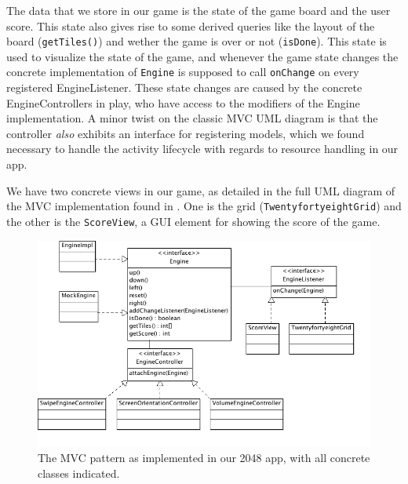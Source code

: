 \documentclass[a4paper, 12pt]{article}
\newcommand{\code}[1]{\texttt{#1}}
\begin{document}
The data that we store in our game is the state of the game board and
the user score. This state also gives rise to some derived queries
like the layout of the board (\code{getTiles()}) and wether the game
is over or not (\code{isDone}). This state is used to visualize the
state of the game, and whenever the game state changes the concrete
implementation of \code{Engine} is supposed to call \code{onChange} on
every registered EngineListener. These state changes are caused by the
concrete EngineControllers in play, who have access to the modifiers
of the Engine implementation. A minor twist on the classic MVC UML
diagram is that the controller \emph{also} exhibits an interface for
registering models, which we found necessary to handle the activity
lifecycle with regards to resource handling in our app.

We have two  concrete views in our  game, as detailed in  the full UML
diagram of the MVC  implementation found in \label{fig:mvc-2.png}. One
is  the  grid  (\code{TwentyfortyeightGrid})  and  the  other  is  the
\code{ScoreView}, a GUI element for showing the score of the game. 

\begin{figure}[!h]
  \includegraphics[width=\linewidth]{mvc-2.png}
  \caption{The MVC pattern as implemented in our 2048 app, with all
    concrete classes indicated.}
  \label{fig:mvc-2.png}
\end{figure}
\end{document}
